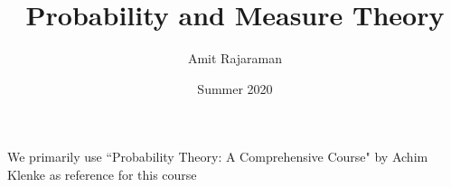 \documentclass{article}
\title{Probability and Measure Theory}
\author{Amit Rajaraman}
\date{Summer 2020}
\numberwithin{equation}{section}
\theoremstyle{definition}
\numberwithin{definition}{section}
\numberwithin{theorem}{section}
\theoremstyle{remark}
\numberwithin{exercise}{section}
\begin{document}
\maketitle
\thispagestyle{empty}

\setcounter {section}{-1}

\begin{center}
    We primarily use ``Probability Theory: A Comprehensive Course"\cite{klenke} by Achim Klenke as reference for this course
\end{center}

\tableofcontents
\clearpage









   

\end{document}
